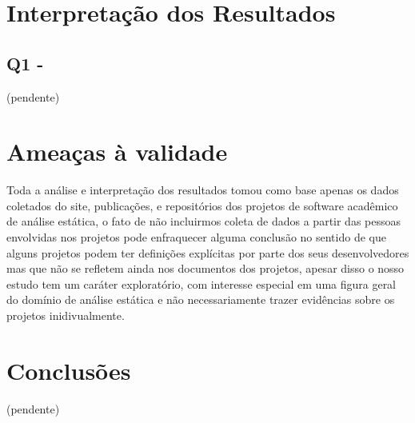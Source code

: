 \section{Interpretação dos Resultados} \label{estudo3:interpretacao}

\subsection{Q1 - \EstudoDoisQuestaoUm}

(pendente)

\section{Ameaças à validade}

Toda a análise e interpretação dos resultados tomou como base apenas os dados
coletados do site, publicações, e repositórios dos projetos de software
acadêmico de análise estática, o fato de não incluirmos coleta de dados a
partir das pessoas envolvidas nos projetos pode enfraquecer alguma conclusão no
sentido de que alguns projetos podem ter definições explícitas por parte dos
seus desenvolvedores mas que não se refletem ainda nos documentos dos projetos,
apesar disso o nosso estudo tem um caráter exploratório, com interesse especial em
uma figura geral do domínio de análise estática e não necessariamente trazer
evidências sobre os projetos inidivualmente.

\section{Conclusões} \label{estudo3:conclusoes}

(pendente)




